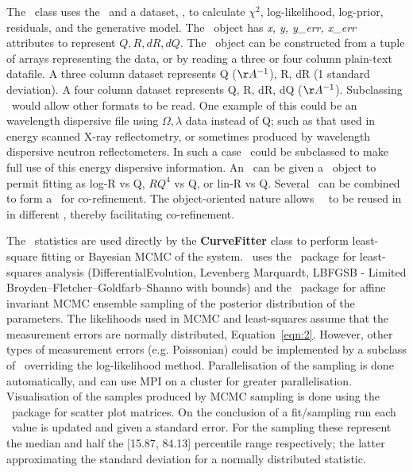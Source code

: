 \documentclass[12pt]{article}
\begin{document}
The \Objective\ class uses the \ReflectModel\ and a dataset, \DataD, to calculate $\chi^2$, log-likelihood, log-prior, residuals, and the generative model.
The \DataD\ object has \emph{x, y, y\_err, x\_err} attributes to represent $Q, R, dR, dQ$. The \DataD\ object can be constructed from a tuple of arrays representing the data, or by reading a three or four column plain-text datafile. A three column dataset represents Q ($\AA^{-1}$), R, dR (1 standard deviation). A four column dataset represents Q, R, dR, dQ ($\AA^{-1}$). Subclassing \DataD\ would allow other formats to be read. One example of this could be an wavelength dispersive file using $\Omega, \lambda$ data instead of Q; such as that used in energy scanned X-ray reflectometry, or sometimes produced by wavelength dispersive neutron reflectometers. In such a case \ReflectModel\ could be subclassed to make full use of this energy dispersive information.
An \Objective\ can be given a \Transform\ object to permit fitting as log-R vs Q, $RQ^4$ vs Q, or lin-R vs Q. Several \Objective\ can be combined to form a \GlobalObjective\ for co-refinement. The object-oriented nature allows \Parameter\, \Component\ to be reused in in different \Objective, thereby facilitating co-refinement.

The \Objective\ statistics are used directly by the \textbf{CurveFitter} class to perform least-square fitting or Bayesian MCMC of the system. \ uses the \SciPy\ package for least-squares analysis (DifferentialEvolution, Levenberg Marquardt, LBFGSB - Limited Broyden–Fletcher–Goldfarb–Shanno with bounds) and the  \emcee\ package \cite{emcee} for affine invariant MCMC ensemble sampling of the posterior distribution of the parameters. The likelihoods used in MCMC and least-squares assume that the measurement errors are normally distributed, Equation~\ref{eqn:2}. However, other types of measurement errors (e.g. Poissonian) could be implemented by a subclass of \Objective\  overriding the log-likelihood method.
Parallelisation of the sampling is done automatically, and can use MPI on a cluster for greater parallelisation. Visualisation of the samples produced by MCMC sampling is done using the \corner\ package \cite{corner} for scatter plot matrices. On the conclusion of a fit/sampling run each \Parameter\ value is updated and given a standard error. For the sampling these represent the median and half the [15.87, 84.13] percentile range respectively; the latter approximating the standard deviation for a normally distributed statistic.
\end{document}
